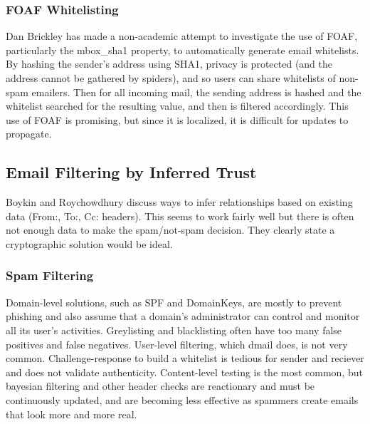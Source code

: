 \documentclass[onecolumn]{acm_proc_article-sp}
\begin{document}
\subsubsection{FOAF Whitelisting}
Dan Brickley has made a non-academic attempt to investigate the use of FOAF, particularly the mbox\_sha1 property, to automatically generate email whitelists. By hashing the sender's address using SHA1, privacy is protected (and the address cannot be gathered by spiders), and so users can share whitelists of non-spam emailers. Then for all incoming mail, the sending address is hashed and the whitelist searched for the resulting value, and then is filtered accordingly. This use of FOAF is promising, but since it is localized, it is difficult for updates to propagate\cite{foafWhitelisting}.

\subsection{Email Filtering by Inferred Trust}
Boykin and Roychowdhury discuss ways to infer relationships based on existing data (From:, To:, Cc: headers)\cite{boykin04email}. This seems to work fairly well but there is often not enough data to make the spam/not-spam decision. They clearly state a cryptographic solution would be ideal.

\subsubsection{Spam Filtering}
Domain-level solutions, such as SPF and DomainKeys, are mostly to prevent phishing and also assume that a domain's administrator can control and monitor all its user's activities. Greylisting and blacklisting often have too many false positives and false negatives. User-level filtering, which dmail does, is not very common. Challenge-response to build a whitelist is tedious for sender and reciever and does not validate authenticity. Content-level testing is the most common, but bayesian filtering and other header checks are reactionary and must be continuously updated, and are becoming less effective as spammers create emails that look more and more real. 
\end{document}

